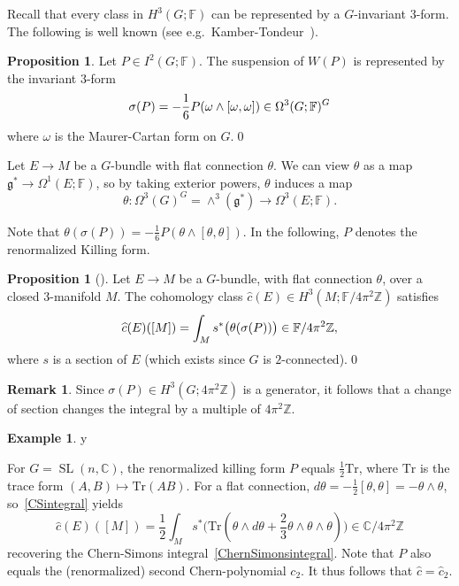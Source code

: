 \documentclass[11pt]{amsart}
\theoremstyle{definition}
\newtheorem{proposition}[theorem]{Proposition}
\newtheorem{remark}[theorem]{Remark}
\newtheorem{example}[theorem]{Example}
\numberwithin{equation}{section}
\def\printname#1{
        \if\draft y
                \smash{\makebox[0pt]{\hspace{-0.5in}
                        \raisebox{8pt}{\tt\tiny #1}}}
        \fi
}
\def\lbl#1{\label{#1}\printname{#1}}
\DeclareMathOperator{\SL}{SL}
\DeclareMathOperator{\Tr}{Tr}
\newcommand{\C}{\mathbb C}
\newcommand{\F}{\mathbb F}
\newcommand{\Z}{\mathbb Z}
\def\Tr{\mathrm{Tr}}
\begin{document}
Recall that every class in $H^3(G;\F)$ can be represented by a $G$-invariant 
$3$-form.
The following is well known (see e.g.~Kamber-Tondeur~\cite[(5.74) p.~116]{KamberTondeur}).

\begin{proposition} Let $P\in I^2(G;\F)$. The suspension of $W(P)$ is 
represented by the invariant $3$-form
\begin{equation}\lbl{sigmaPformula}
\sigma(P)=-\frac{1}{6}P(\omega\wedge[\omega,\omega])\in\Omega^3(G;\F)^G
\end{equation}
where $\omega$ is the Maurer-Cartan form on $G$.\qed
\end{proposition}

Let $E\to M$ be a $G$-bundle with flat connection $\theta$. We can view 
$\theta$ as a map $\mathfrak g^*\to\Omega^1(E;\F)$, so by taking exterior 
powers, $\theta$ induces a map
\begin{equation}
\theta\colon\Omega^3(G)^G=\wedge^3(\mathfrak g^*)\to\Omega^3(E;\F).
\end{equation}

Note that $\theta(\sigma(P))=-\frac{1}{6}P(\theta\wedge[\theta,\theta])$. 
In the following, $P$ denotes the renormalized Killing form.

\begin{proposition}[{\cite[Proposition~2.8]{CheegerSimons}}]
Let $E\to M$ be a $G$-bundle, with flat connection $\theta$, over a closed 
$3$-manifold $M$.
The cohomology class $\widehat c(E)\in H^3(M;\F/4\pi^2\Z)$ satisfies 
\begin{equation}
\lbl{CSintegral}
\widehat c(E)([M])=\int_{M} s^*\big(\theta(\sigma(P))\big)\in \F/4\pi^2\Z,
\end{equation}
where $s$ is a section of $E$ (which exists since $G$ is $2$-connected).\qed
\end{proposition}

\begin{remark}
Since $\sigma(P)\in H^3(G;4\pi^2\Z)$ is a generator, it follows that a 
change of section changes the integral by a multiple of $4\pi^2\Z$.
\end{remark}

\begin{example}
\lbl{SLnExample}
For $G=\SL(n,\C)$, the renormalized killing form $P$ equals $\frac{1}{2}\Tr$, 
where $\Tr$ is the trace form $(A,B)\mapsto \Tr(AB)$. For a flat connection, $d\theta=-\frac{1}{2}[\theta,\theta]=-\theta\wedge\theta$, so~\eqref{CSintegral} yields
\begin{equation}
\widehat c(E)([M])=\frac{1}{2}\int_{M} 
s^*\big(\Tr(\theta\wedge d\theta+\frac{2}{3}\theta\wedge\theta\wedge\theta)\big)\in 
\C/4\pi^2\Z
\end{equation}
recovering the Chern-Simons integral~\eqref{ChernSimonsintegral}. Note that $P$ also equals the (renormalized) second Chern-polynomial $c_2$. 
It thus follows that $\widehat c=\widehat c_2$. 
\end{example}
\end{document}

